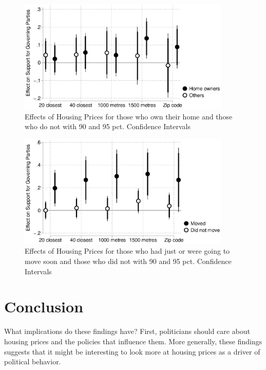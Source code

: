 \documentclass[12pt,a4paper]{article}
\begin{document}
\begin{figure}[htbp!]
	\includegraphics[width=0.9\textwidth]{../figures/homeown.eps}
	\centering
	\caption{Effects of Housing Prices for those who own their home and those who do not with 90  and 95 pct. Confidence Intervals}\label{homeown}
\end{figure}

\begin{figure}[htbp!]
	\includegraphics[width=0.9\textwidth]{../figures/moving.eps}
	\centering
	\caption{Effects of Housing Prices for those who had just or were going to move soon and those who did not with 90 and 95 pct. Confidence Intervals}\label{move}
\end{figure}





\section{Conclusion}

What implications do these findings have? First,  politicians should care about housing prices and the policies that influence them.  More generally, these findings suggests that it might be interesting to look more at housing prices as a driver of political behavior.
 
\end{document}
